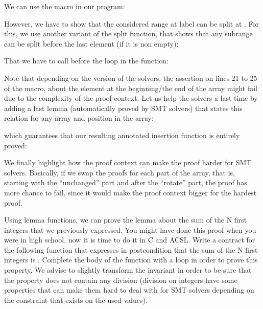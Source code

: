 We can use the macro in our program:




However, we have to show that the considered range at label  can
be split at . For this, we use another variant of the split
function, that shows that any subrange can be split before the last element (if
it is non empty):






That we have to call before the loop in the  function:




Note that depending on the version of the solvers, the assertion on lines 21 to
25 of the macro, about the element at the beginning/the end of the array might
fail due to the complexity of the proof context. Let us help the solvers a last
time by adding a last lemma (automatically proved by SMT solvers) that states
this relation for any array and position in the array:





which guarantees that our resulting annotated insertion function is entirely
proved:




We finally highlight how the proof context can make the proof harder for SMT
solvers. Basically, if we swap the proofs for each part of the array, that is,
starting with the ``unchanged'' part and after the ``rotate'' part, the proof has
more chance to fail, since it would make the proof context bigger for the
hardest proof.






Using lemma functions, we can prove the lemma about the sum of the N first
integers that we previously expressed. You might have done this proof when you
were in high school, now it is time to do it in C and ACSL. Write a contract for
the following function that expresses in postcondition that the sum of the N
first integers is . Complete the body of the function with
a loop in order to prove this property. We advise to slightly transform the
invariant in order to be sure that the property does not contain any division
(division on integers have some properties that can make them hard to deal with
for SMT solvers depending on the constraint that exists on the used values).


